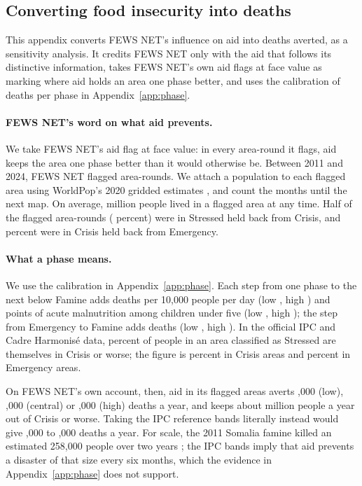\documentclass[11pt]{article}
\begin{document}
\begin{appendices}
\section{Converting food insecurity into deaths}\label{app:lives}

This appendix converts FEWS NET's influence on aid into deaths averted, as a sensitivity analysis. It credits FEWS NET only with the aid that follows its distinctive information, takes FEWS NET's own aid flags at face value as marking where aid holds an area one phase better, and uses the calibration of deaths per phase in Appendix~\ref{app:phase}.

\paragraph{FEWS NET's word on what aid prevents.} We take FEWS NET's aid flag at face value: in every area-round it flags, aid keeps the area one phase better than it would otherwise be. Between 2011 and 2024, FEWS NET flagged \bcFlaggedRounds{} area-rounds. We attach a population to each flagged area using WorldPop's 2020 gridded estimates \citep{worldpop2020}, and count the months until the next map. On average, \bcPeople{} million people lived in a flagged area at any time. Half of the flagged area-rounds (\bcPhaseTwo{} percent) were in Stressed held back from Crisis, and \bcPhaseThree{} percent were in Crisis held back from Emergency.

\paragraph{What a phase means.} We use the calibration in Appendix~\ref{app:phase}. Each step from one phase to the next below Famine adds \calCdrMid{} deaths per 10,000 people per day (low \calCdrLo{}, high \calCdrHi{}) and \calGamMid{} points of acute malnutrition among children under five (low \calGamLo{}, high \calGamHi{}); the step from Emergency to Famine adds \calFamMid{} deaths (low \calFamLo{}, high \calFamHi{}). In the official IPC and Cadre Harmonis\'e data, \bcSthreeStressed{} percent of people in an area classified as Stressed are themselves in Crisis or worse; the figure is \bcSthreeCrisis{} percent in Crisis areas and \bcSthreeEmerg{} percent in Emergency areas.

On FEWS NET's own account, then, aid in its flagged areas averts \bcGrossCons{},000 (low), \bcGrossMid{},000 (central) or \bcGrossUp{},000 (high) deaths a year, and keeps about \bcGrossCrisis{} million people a year out of Crisis or worse. Taking the IPC reference bands literally instead would give \ipcGrossCons{},000 to \ipcGrossUp{},000 deaths a year. For scale, the 2011 Somalia famine killed an estimated 258,000 people over two years \citep{checchi2013}; the IPC bands imply that aid prevents a disaster of that size every six months, which the evidence in Appendix~\ref{app:phase} does not support.


\end{appendices}
\end{document}
